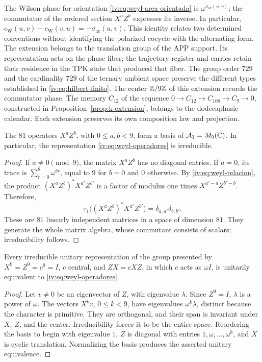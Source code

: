 The Wilson phase for orientation
\eqref{iv:eq:weyl-area-orientada} is
\(\omega^{\sigma_{\mathrm{ar}}(u,v)}\); the commutator of the
ordered section \(X^aZ^b\) expresses its inverse. In particular,
\(c_{\mathrm W}(u,v)-c_{\mathrm W}(v,u)
=-\sigma_{\mathrm{ar}}(u,v)\).
This identity relates two determined conventions without identifying
the polarized cocycle with the alternating form. The extension belongs
to the translation group of the APP support. Its representation acts on
the phase fiber; the trajectory register and carries retain
their residence in the TPK state that produced that fiber. The group order \(729\)
and the cardinality \(729\) of the ternary ambient space preserve the
different types established in \eqref{iv:eq:hilbert-finito}.
The center \(\mathbb Z/9\mathbb Z\) of this extension records the commutator
phase. The memory \(C_{12}\) of the sequence
\(0\to C_{12}\to C_{108}\to C_9\to0\), constructed in
Proposition~\ref{prop:k-extension}, belongs to the dodecaphasic
calendar. Each extension preserves its own composition law and
projection.

\begin{proposition}
\label{iv:prop:weyl-completo}
The \(81\) operators \(X^aZ^b\), with \(0\leq a,b<9\), form
a basis of \(\mathcal A_1=M_9(\mathbb C)\). In particular, the
representation \eqref{iv:eq:weyl-operadores} is irreducible.
\end{proposition}
\begin{proof}
If \(a\neq0\pmod9\), the matrix \(X^aZ^b\) has no diagonal
entries. If \(a=0\), its trace is
\(\sum_{r=0}^8\omega^{br}\), equal to \(9\) for \(b=0\) and
\(0\) otherwise. By \eqref{iv:eq:weyl-relacion}, the
product \((X^aZ^b)^*X^{a'}Z^{b'}\) is a factor of modulus one
times \(X^{a'-a}Z^{b'-b}\). Therefore,
\[
 \tau_1\bigl((X^aZ^b)^*X^{a'}Z^{b'}\bigr)
 =\delta_{a,a'}\delta_{b,b'}.
\]
These are \(81\) linearly independent matrices in a space of
dimension \(81\). They generate the whole matrix algebra, whose commutant
consists of scalars; irreducibility follows.
\end{proof}

\begin{theorem}
\label{iv:thm:weyl-unicidad}
Every irreducible unitary representation of the group presented by
\(X^9=Z^9=c^9=I\), \(c\) central, and \(ZX=cXZ\), in which
\(c\) acts as \(\omega I\), is unitarily equivalent to
\eqref{iv:eq:weyl-operadores}.
\end{theorem}
\begin{proof}
Let \(v\neq0\) be an eigenvector of \(Z\), with eigenvalue \(\lambda\).
Since \(Z^9=I\), \(\lambda\) is a power of \(\omega\).
The vectors \(X^kv\), \(0\leq k<9\), have eigenvalues
\(\omega^k\lambda\), distinct because the character is primitive.
They are orthogonal, and their span is invariant under \(X\),
\(Z\), and the center. Irreducibility forces it to be the entire
space. Reordering the basis to begin with eigenvalue \(1\),
\(Z\) is diagonal with entries \(1,\omega,\ldots,\omega^8\),
and \(X\) is cyclic translation. Normalizing the basis
produces the asserted unitary equivalence.
\end{proof}

